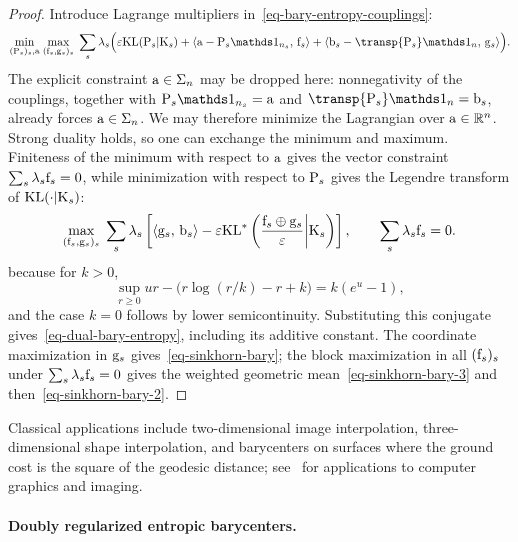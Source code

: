 \begin{proof}
	Introduce Lagrange multipliers in~\eqref{eq-bary-entropy-couplings}:
	\begin{align*}
		\umin{(\P_s)_s,\a}
		\umax{(\fD_s,\gD_s)_s}
		\sum_s\la_s\Big(
			\epsilon\KLD(\P_s|\K_s)
			+\dotp{\a-\P_s\ones_{n_s}}{\fD_s}
			+\dotp{\b_s-\transp{\P_s}\ones_n}{\gD_s}
		\Big).
	\end{align*}
	The explicit constraint $\a\in\simplex_n$ may be dropped here: nonnegativity of the couplings, together with $\P_s\ones_{n_s}=\a$ and $\transp{\P_s}\ones_n=\b_s$, already forces $\a\in\simplex_n$. We may therefore minimize the Lagrangian over $\a\in\RR^n$. Strong duality holds, so one can exchange the minimum and maximum. Finiteness of the minimum with respect to $\a$ gives the vector constraint $\sum_s\la_s\fD_s=0$, while minimization with respect to $\P_s$ gives the Legendre transform of $\KLD(\cdot|\K_s)$:
	\[
		\umax{(\fD_s,\gD_s)_s}
		\sum_s\la_s
		\left[
			\dotp{\gD_s}{\b_s}
			-\epsilon
			\KLD^*\left(\frac{\fD_s\oplus\gD_s}{\epsilon}\middle|\K_s\right)
		\right],
		\qquad
		\sum_s\la_s\fD_s=0.
	\]
	because for $k>0$,
	\[
		\sup_{r\geq0}
		ur-\big(r\log(r/k)-r+k\big)
		=
		k(e^u-1),
	\]
		and the case $k=0$ follows by lower semicontinuity. Substituting this conjugate gives~\eqref{eq-dual-bary-entropy}, including its additive constant. The coordinate maximization in $\gD_s$ gives~\eqref{eq-sinkhorn-bary}; the block maximization in all $(\fD_s)_s$ under $\sum_s\lambda_s\fD_s=0$ gives the weighted geometric mean~\eqref{eq-sinkhorn-bary-3} and then~\eqref{eq-sinkhorn-bary-2}.
\end{proof}

Classical applications include two-dimensional image interpolation, three-dimensional shape interpolation, and barycenters on surfaces where the ground cost is the square of the geodesic distance; see~\cite{2015-solomon-siggraph} for applications to computer graphics and imaging.

\paragraph{Doubly regularized entropic barycenters.}

